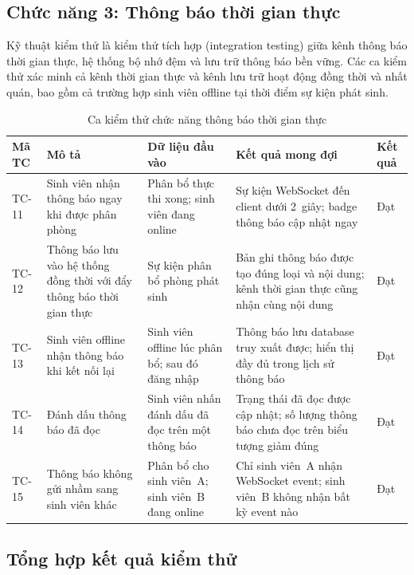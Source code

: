 \documentclass[../DoAn.tex]{subfiles}
\begin{document}
\subsection*{Chức năng 3: Thông báo thời gian thực}

Kỹ thuật kiểm thử là kiểm thử tích hợp (integration testing) giữa kênh thông
báo thời gian thực, hệ thống bộ nhớ đệm và lưu trữ thông báo bền vững. Các ca
kiểm thử xác minh cả kênh thời gian thực và kênh lưu trữ hoạt động đồng thời
và nhất quán, bao gồm cả trường hợp sinh viên offline tại thời điểm sự kiện
phát sinh.

\vspace{-6pt}
\begin{table}[H]
\centering
\caption{Ca kiểm thử chức năng thông báo thời gian thực}
\label{tab:tc_notification}
\small
\begin{tabular}{|p{1.0cm}|p{2.6cm}|p{3.2cm}|p{3.8cm}|p{1.4cm}|}
\hline
\textbf{Mã TC} & \textbf{Mô tả} & \textbf{Dữ liệu đầu vào} & \textbf{Kết quả mong đợi} & \textbf{Kết quả} \\
\hline
TC-11 & Sinh viên nhận thông báo ngay khi được phân phòng & Phân bổ thực thi xong; sinh viên đang online & Sự kiện WebSocket đến client dưới 2~giây; badge thông báo cập nhật ngay & Đạt \\
\hline
TC-12 & Thông báo lưu vào hệ thống đồng thời với đẩy thông báo thời gian thực & Sự kiện phân bổ phòng phát sinh & Bản ghi thông báo được tạo đúng loại và nội dung; kênh thời gian thực cũng nhận cùng nội dung & Đạt \\
\hline
TC-13 & Sinh viên offline nhận thông báo khi kết nối lại & Sinh viên offline lúc phân bổ; sau đó đăng nhập & Thông báo lưu database truy xuất được; hiển thị đầy đủ trong lịch sử thông báo & Đạt \\
\hline
TC-14 & Đánh dấu thông báo đã đọc & Sinh viên nhấn đánh dấu đã đọc trên một thông báo & Trạng thái đã đọc được cập nhật; số lượng thông báo chưa đọc trên biểu tượng giảm đúng & Đạt \\ \hline
TC-15 & Thông báo không gửi nhầm sang sinh viên khác & Phân bổ cho sinh viên~A; sinh viên~B đang online & Chỉ sinh viên~A nhận WebSocket event; sinh viên~B không nhận bất kỳ event nào & Đạt \\
\hline
\end{tabular}
\end{table}
\vspace{-4pt}

\subsection*{Tổng hợp kết quả kiểm thử}
\end{document}
